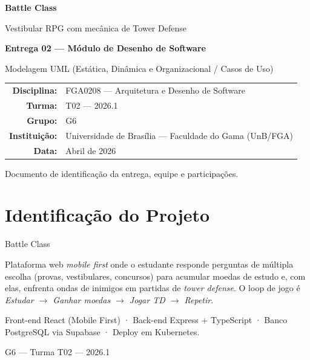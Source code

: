 \documentclass[11pt,a4paper]{article}
\begin{document}
\begin{titlepage}
\centering
\vspace*{3cm}
{\color{bcBlueDark}\Huge\bfseries Battle Class\par}
\vspace{0.5cm}
{\color{bcBlue}\Large Vestibular RPG com mecânica de Tower Defense\par}
\vspace{2cm}
{\large\bfseries Entrega 02 --- Módulo de Desenho de Software\par}
\vspace{0.3cm}
{\large Modelagem UML (Estática, Dinâmica e Organizacional / Casos de Uso)\par}
\vspace{2.5cm}

\begin{tabular}{rl}
  \textbf{Disciplina:} & FGA0208 --- Arquitetura e Desenho de Software \\
  \textbf{Turma:}      & T02 --- 2026.1 \\
  \textbf{Grupo:}      & G6 \\
  \textbf{Instituição:} & Universidade de Brasília --- Faculdade do Gama (UnB/FGA) \\
  \textbf{Data:}       & Abril de 2026 \\
\end{tabular}

\vspace{3cm}

{\color{bcGray}\small Documento de identificação da entrega, equipe e participações.\par}

\vfill
\end{titlepage}

\section{Identificação do Projeto}

\begin{description}[style=multiline,leftmargin=3.5cm]
  \item[Projeto] Battle Class
  \item[Descrição] Plataforma web \emph{mobile first} onde o estudante responde perguntas de múltipla escolha (provas, vestibulares, concursos) para acumular moedas de estudo e, com elas, enfrenta ondas de inimigos em partidas de \emph{tower defense}. O loop de jogo é \emph{Estudar $\to$ Ganhar moedas $\to$ Jogar TD $\to$ Repetir}.
  \item[Stack] Front-end React (Mobile First) · Back-end Express + TypeScript · Banco PostgreSQL via Supabase · Deploy em Kubernetes.
  \item[Grupo] G6 --- Turma T02 --- 2026.1
\end{description}
\end{document}
